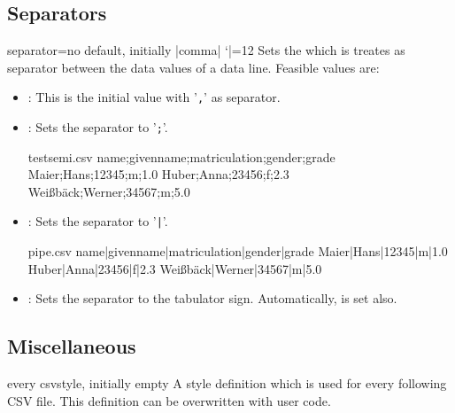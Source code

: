 \documentclass[a4paper,11pt]{ltxdoc}
\begin{document}
\subsection{Separators}\label{sec:separators}%
\begin{docCsvKey}{separator}{=}{no default, initially |comma|}
  \catcode `|=12
  Sets the  which is treates as separator between the data values
  of a data line. Feasible values are:
  \begin{itemize}
  \item{}: This is the initial value with '\texttt{,}' as separator.
  \medskip

  \item{}: Sets the separator to '\texttt{;}'.
\begin{dispExample}
\begin{tcbverbatimwrite}{testsemi.csv}
  name;givenname;matriculation;gender;grade
  Maier;Hans;12345;m;1.0
  Huber;Anna;23456;f;2.3
  Weißbäck;Werner;34567;m;5.0
\end{tcbverbatimwrite}

\end{dispExample}
\medskip

\item{}: Sets the separator to '\texttt{|}'.
\begin{dispExample}
\begin{tcbverbatimwrite}{pipe.csv}
  name|givenname|matriculation|gender|grade
  Maier|Hans|12345|m|1.0
  Huber|Anna|23456|f|2.3
  Weißbäck|Werner|34567|m|5.0
\end{tcbverbatimwrite}

\end{dispExample}
\medskip

\item{}: Sets the separator to the tabulator sign.
  Automatically,  is set also.
  \end{itemize}
\end{docCsvKey}

\clearpage
\subsection{Miscellaneous}%

\begin{docCsvKey}{every csv}{}{style, initially empty}
  A style definition which is used for every following CSV file.
  This definition can be overwritten with user code.
\begin{dispListing}
\end{dispListing}
\end{docCsvKey}
\end{document}
